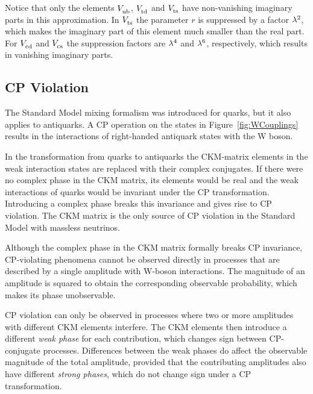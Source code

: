Notice that only the elements $\Vub$, $\Vtd$ and $\Vts$ have non-vanishing imaginary parts in this approximation. In $\Vts$ the parameter $r$ is suppressed by a
factor $\lambda^2$, which makes the imaginary part of this element much smaller than the real part. For $\Vcd$ and $\Vcs$ the suppression
factors are $\lambda^4$ and $\lambda^6$, respectively, which results in vanishing imaginary parts.


\subsection{CP Violation}
\label{subsec:intro_mixCPV_CPV}

The Standard Model mixing formalism was introduced for quarks, but it also applies to antiquarks. A CP operation on the states in
Figure~\ref{fig:WCouplings} results in the interactions of right-handed antiquark states with the W boson.

In the transformation from quarks to antiquarks the CKM-matrix elements in the weak interaction states are replaced with their complex
conjugates. If there were no complex phase in the CKM matrix, its elements would be real and the weak interactions of quarks would be
invariant under the CP transformation. Introducing a complex phase breaks this invariance and gives rise to CP violation. The CKM matrix is
the only source of CP violation in the Standard Model with massless neutrinos.

Although the complex phase in the CKM matrix formally breaks CP invariance, CP-violating phenomena cannot be observed directly in processes
that are described by a single amplitude with W-boson interactions. The magnitude of an amplitude is squared to obtain the corresponding
observable probability, which makes its phase unobservable.

CP violation can only be observed in processes where two or more amplitudes with different CKM elements interfere. The CKM elements then
introduce a different \emph{weak phase} for each contribution, which changes sign between CP-conjugate processes. Differences between the
weak phases do affect the observable magnitude of the total amplitude, provided that the contributing amplitudes also have different
\emph{strong phases}, which do not change sign under a CP transformation.

